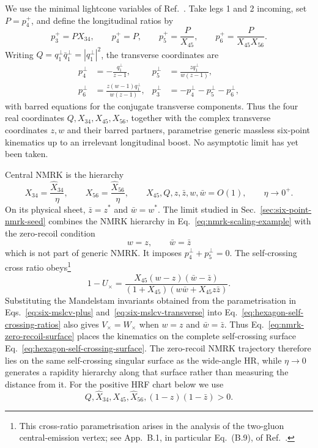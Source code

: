 \documentclass[a4paper,11pt]{article}
\begin{document}
We use the minimal lightcone variables of Ref.~\cite{Byrne:2025phh}.  Take
legs 1 and 2 incoming, set \(P=p_4^+\), and define the longitudinal ratios by
\begin{equation}
 p_3^+=PX_{34},\qquad p_4^+=P,\qquad
 p_5^+=\frac{P}{X_{45}},\qquad
 p_6^+=\frac{P}{X_{45}X_{56}}.
 \label{eq:six-mslcv-plus}
\end{equation}
Writing \(Q=q_1^\perp\bar q_1^\perp=|q_1^\perp|^2\), the transverse
coordinates are
\begin{align}
 p_4^\perp&=-\frac{q_1^\perp}{z-1},&
 p_5^\perp&=\frac{zq_1^\perp}{w(z-1)},\nonumber\\
 p_6^\perp&=\frac{z(w-1)q_1^\perp}{w(z-1)},&
 p_3^\perp&=-p_4^\perp-p_5^\perp-p_6^\perp,
 \label{eq:six-mslcv-transverse}
\end{align}
with barred equations for the conjugate transverse components.  Thus the
four real coordinates \(Q,X_{34},X_{45},X_{56}\), together with the complex
transverse coordinates \(z,w\) and their barred partners, parametrise generic
massless six-point kinematics up to an irrelevant longitudinal boost.  No
asymptotic limit has yet been taken.

Central NMRK is the hierarchy
\begin{equation}
 X_{34}=\frac{\widehat X_{34}}{\eta},\qquad
 X_{56}=\frac{\widehat X_{56}}{\eta},\qquad
 X_{45},Q,z,\bar z,w,\bar w=O(1),\qquad \eta\to0^+.
 \label{eq:nmrk-scaling-example}
\end{equation}
On its physical sheet, \(\bar z=z^*\) and \(\bar w=w^*\).  The limit studied
in Sec.~\ref{sec:six-point-nmrk-seed} combines the NMRK hierarchy in
Eq.~\eqref{eq:nmrk-scaling-example} with the zero-recoil condition
\begin{equation}
 w=z,\qquad \bar w=\bar z
 \label{eq:nmrk-zero-recoil-surface}
\end{equation}
which is not part of generic NMRK.  It imposes
\(p_4^\perp+p_5^\perp=0\).  The self-crossing cross ratio obeys\footnote{This
cross-ratio parametrisation arises in the analysis of the two-gluon
central-emission vertex; see App.~B.1, in particular Eq.~(B.9), of
Ref.~\cite{Byrne:2022cev}.}
\begin{equation}
 1-U_\times=
 \frac{X_{45}(w-z)(\bar w-\bar z)}
 {(1+X_{45})(w\bar w+X_{45}z\bar z)}.
 \label{eq:nmrk-cross-ratio-boundary}
\end{equation}
Substituting the Mandelstam invariants obtained from the parametrisation in
Eqs.~\eqref{eq:six-mslcv-plus} and~\eqref{eq:six-mslcv-transverse} into
Eq.~\eqref{eq:hexagon-self-crossing-ratios} also gives
\(V_\times=W_\times\) when \(w=z\) and
\(\bar w=\bar z\).  Thus Eq.~\eqref{eq:nmrk-zero-recoil-surface} places the
kinematics on the complete self-crossing surface
Eq.~\eqref{eq:hexagon-self-crossing-surface}.  The zero-recoil NMRK trajectory
therefore lies on the same self-crossing singular surface as the wide-angle
HR, while \(\eta\to0\) generates a rapidity hierarchy along that surface
rather than measuring the distance from it.
For the positive HRF chart below we use
\begin{equation}
 Q,\widehat X_{34},X_{45},\widehat X_{56},
 (1-z)(1-\bar z)>0.
 \label{eq:nmrk-domain-example}
\end{equation}
\end{document}
